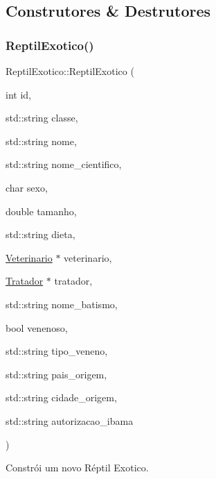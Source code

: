 \subsection{Construtores \& Destrutores}
\mbox{\label{classReptilExotico_a116a23b987d0470f9631e04ee4c99a3b}} 
\subsubsection{\texorpdfstring{Reptil\+Exotico()}{ReptilExotico()}\hspace{0.1cm}{\footnotesize\ttfamily [1/3]}}
{\footnotesize\ttfamily Reptil\+Exotico\+::\+Reptil\+Exotico (\begin{DoxyParamCaption}\item[{int}]{id,  }\item[{std\+::string}]{classe,  }\item[{std\+::string}]{nome,  }\item[{std\+::string}]{nome\+\_\+cientifico,  }\item[{char}]{sexo,  }\item[{double}]{tamanho,  }\item[{std\+::string}]{dieta,  }\item[{\hyperlink{classVeterinario}{Veterinario} $\ast$}]{veterinario,  }\item[{\hyperlink{classTratador}{Tratador} $\ast$}]{tratador,  }\item[{std\+::string}]{nome\+\_\+batismo,  }\item[{bool}]{venenoso,  }\item[{std\+::string}]{tipo\+\_\+veneno,  }\item[{std\+::string}]{pais\+\_\+origem,  }\item[{std\+::string}]{cidade\+\_\+origem,  }\item[{std\+::string}]{autorizacao\+\_\+ibama }\end{DoxyParamCaption})}



Constrói um novo Réptil Exotico. 


